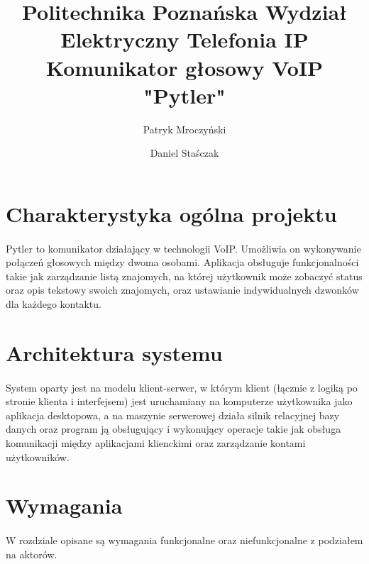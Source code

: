 \documentclass{article}
\title{\Huge{
  \indexspace \textbf{Politechnika Poznańska Wydział Elektryczny}  \indexspace Telefonia IP \indexspace Komunikator głosowy VoIP \indexspace \textbf{"Pytler"}}}
\author{Patryk Mroczyński \and Daniel Staśczak}
\begin{document}
  \maketitle
  \newpage
  \tableofcontents
  \newpage

  \section{Charakterystyka ogólna projektu}
  \paragraph{} Pytler to komunikator działający w technologii VoIP. Umożliwia on wykonywanie połączeń głosowych między dwoma osobami. Aplikacja obsługuje funkcjonalności takie jak zarządzanie listą znajomych, na której użytkownik może zobaczyć status oraz opis tekstowy swoich znajomych, oraz ustawianie indywidualnych dzwonków dla każdego kontaktu.
  \section{Architektura systemu}
  \paragraph{} System oparty jest na modelu klient-serwer, w którym klient (łącznie z logiką po stronie klienta i interfejsem) jest uruchamiany na komputerze użytkownika jako aplikacja desktopowa, a na maszynie serwerowej działa silnik relacyjnej bazy danych oraz program ją obsługujący i wykonujący operacje takie jak obsługa komunikacji między aplikacjami klienckimi oraz zarządzanie kontami użytkowników.
  \section{Wymagania}
  \paragraph{} W rozdziale opisane są wymagania funkcjonalne oraz niefunkcjonalne z podziałem na aktorów.
\end{document}
